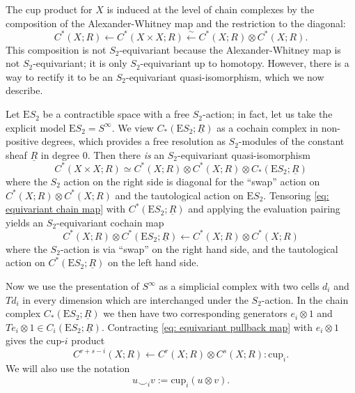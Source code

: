 \documentclass[10pt, reqno]{amsart}
\numberwithin{equation}{subsection}
\newcommand{\Z}{\mathbf{Z}}
\newcommand{\ul}[1]{\underline{#1}}
\newcommand{\mrm}[1]{\mathrm{#1}}
\newcommand{\co}{\colon}
\theoremstyle{remark}
\newtheorem{remark}[thm]{Remark}
\begin{document}
The cup product for $X$ is induced at the level of chain complexes by the composition of the Alexander-Whitney map and the restriction to the diagonal: 
\begin{equation}\label{eq: rest mult}
C^*(X;R) \leftarrow C^*(X \times X; R) \xleftarrow{\sim} C^*(X;R) \otimes C^*(X;R).
\end{equation}
This composition is not $S_2$-equivariant because the Alexander-Whitney map is not $S_2$-equivariant; it is only $S_2$-equivariant up to homotopy. However, there is a way to rectify it to be an $S_2$-equivariant quasi-isomorphism, which we now describe. 

Let $\mrm{E}S_2$ be a contractible space with a free $S_2$-action; in fact, let us take the explicit model $\mrm{E}S_2 = S^{\infty}$. We view $C_*(\mrm{E}S_2; \ul{R})$ as a cochain complex in non-positive degrees, which provides a free resolution as $S_2$-modules of the constant sheaf $\ul{R}$ in degree $0$. Then there \emph{is} an $S_2$-equivariant quasi-isomorphism
\begin{equation}\label{eq: equivariant chain map}
C^*(X \times X; R) \simeq C^*(X;R) \otimes C^*(X;R) \otimes C_*(\mrm{E}S_2; \ul{R})
\end{equation}
where the $S_2$ action on the right side is diagonal for the ``swap'' action on $C^*(X;R) \otimes C^*(X;R)$ and the tautological action on $\mrm{E}S_2$.  Tensoring \eqref{eq: equivariant chain map} with $C^*(\mrm{E}S_2; \ul{R})$ and applying the evaluation pairing yields an $S_2$-equivariant cochain map
\begin{equation}\label{eq: equivariant pullback map}
C^*(X; R) \otimes  C^*(\mrm{E}S_2; \ul{R}) \leftarrow C^*(X; R) \otimes C^*(X; R)
\end{equation}
where the $S_2$-action is via ``swap'' on the right hand side, and the tautological action on $C^*(\mrm{E}S_2; \ul{R})$ on the left hand side.



Now we use the presentation of $S^{\infty}$ as a simplicial complex with two cells $d_i$ and $Td_i$ in every dimension which are interchanged under the $S_2$-action. In the chain complex $C_*(\mrm{E}S_2; \ul{R})$ we then have two corresponding generators $e_i \otimes 1$ and $Te_i \otimes 1 \in C_i(\mrm{E}S_2; \ul{R})$. Contracting \eqref{eq: equivariant pullback map} with $e_i \otimes 1$ gives the cup-$i$ product
\[
C^{r+s-i} (X;R) \leftarrow C^r(X; R) \otimes C^s(X; R) \co \mrm{cup}_i.
\] 
We will also use the notation 
\[
u  \smile_i v := \mrm{cup}_i(u \otimes v).
\]
\end{document}
